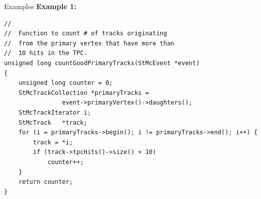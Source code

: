 \begin{Entry}
\item[Examples] 
{\bf Example 1:}
{\footnotesize
\begin{verbatim}
//
//  Function to count # of tracks originating
//  from the primary vertex that have more than
//  10 hits in the TPC.
unsigned long countGoodPrimaryTracks(StMcEvent *event)
{
    unsigned long counter = 0;
    StMcTrackCollection *primaryTracks =
                event->primaryVertex()->daughters();
    StMcTrackIterator i;
    StMcTrack   *track;
    for (i = primaryTracks->begin(); i != primaryTracks->end(); i++) {
        track = *i;
        if (track->tpcHits()->size() > 10)
            counter++;
    }
    return counter;
}
\end{verbatim}
}%

\end{Entry}

%
%

\printindex


\bye

%
%

%
%

